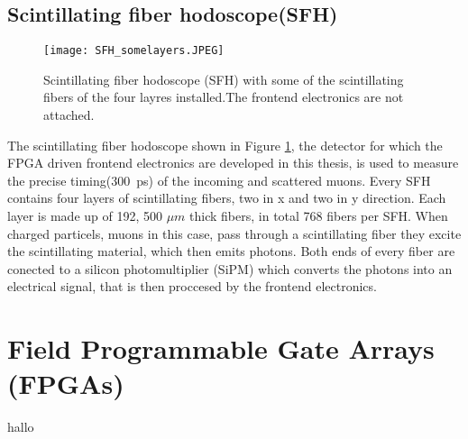 \subsection{Scintillating fiber hodoscope(SFH)}
\begin{figure}[H]
	\centering
	\texttt{[image: SFH\_somelayers.JPEG]}
	\caption{Scintillating fiber hodoscope (SFH) with some of the scintillating fibers of the four layres installed.The frontend electronics are not attached.\autocite{InternalcommunicationKarl}}
	\label{SFHpicture}
\end{figure}
The scintillating fiber hodoscope shown in Figure \ref{SFHpicture}, 
the detector for which the FPGA driven frontend electronics are developed in this thesis,
is used to measure the precise timing(\SI{300}{\pico\second}\Autocite{Amber2022Status}) of the incoming and scattered muons. 
Every SFH contains four layers of scintillating fibers, two in x and two in y direction.
Each layer is made up of 192\autocite{Amber2022Status}, 500 $\mu m$ thick\autocite{Amber2024Status} fibers, in total 768\autocite{Amber2022Status} fibers per SFH. 
When charged particels, muons in this case, pass through a scintillating fiber they excite the scintillating material, 
which then emits photons. Both ends of every fiber are conected to a silicon photomultiplier (SiPM) which converts the photons into an electrical signal,
 that is then proccesed by the frontend electronics.

\section{Field Programmable Gate Arrays (FPGAs)}\label{sec:FPGA}
hallo 
